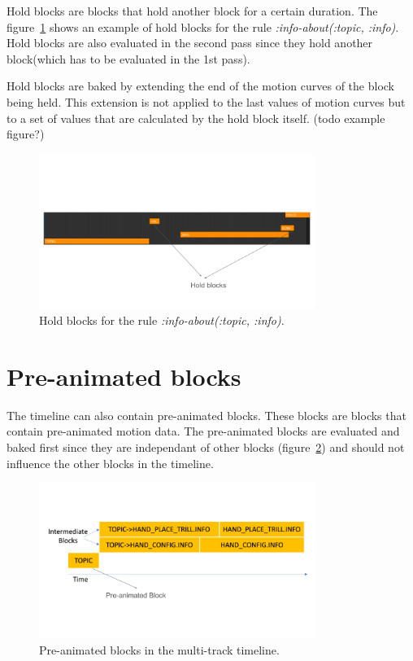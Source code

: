 \documentclass[../../main.tex]{subfiles}
\begin{document}
Hold blocks are blocks that hold another block for a certain duration. The figure~\ref{fig:hold_blocks} shows an example of hold blocks for the rule \emph{:info-about(:topic, :info)}. Hold blocks are also evaluated in the second pass since they hold another block(which has to be evaluated in the 1st pass).

Hold blocks are baked by extending the end of the motion curves of the block being held. This extension is not applied to the last values of motion curves but to a set of values that are calculated by the hold block itself. (todo example figure?)

\begin{figure}
    \centering
    \includegraphics[width=0.8\textwidth]{chapters/multi_track/images/hold_blocks.png}
    \caption{Hold blocks for the rule \emph{:info-about(:topic, :info)}.}
    \label{fig:hold_blocks}
\end{figure}

\section{Pre-animated blocks}
\label{ch:multi_track:preanim_blocks}

The timeline can also contain pre-animated blocks. These blocks are blocks that contain pre-animated motion data. The pre-animated blocks are evaluated and baked first since they are independant of other blocks (figure~\ref{fig:preanim_blocks}) and should not influence the other blocks in the timeline.

\begin{figure}[h]
    \centering
    \includegraphics[width=0.8\textwidth]{chapters/multi_track/images/preanim_blocks.png}
    \caption{Pre-animated blocks in the multi-track timeline.}
    \label{fig:preanim_blocks}
\end{figure}
\end{document}
